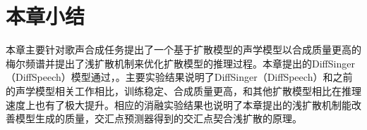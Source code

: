 \section{本章小结}
本章主要针对歌声合成任务提出了一个基于扩散模型的声学模型以合成质量更高的梅尔频谱并提出了浅扩散机制来优化扩散模型的推理过程。本章提出的DiffSinger（DiffSpeech）模型通过，。主要实验结果说明了DiffSinger（DiffSpeech）和之前的声学模型相关工作相比，训练稳定、合成质量更高，和其他扩散模型相比在推理速度上也有了极大提升。相应的消融实验结果也说明了本章提出的浅扩散机制能改善模型生成的质量，交汇点预测器得到的交汇点契合浅扩散的原理。
